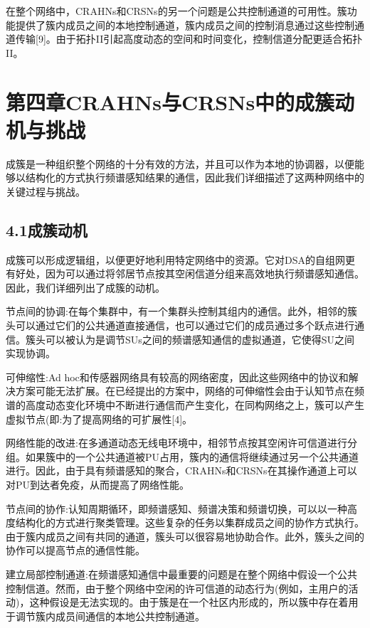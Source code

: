 \documentclass[a4paper,AutoFakeBold,oneside,12pt]{book}
\begin{document}
  在整个网络中，CRAHNs和CRSNs的另一个问题是公共控制通道的可用性。簇功能提供了簇内成员之间的本地控制通道，簇内成员之间的控制消息通过这些控制通道传输[9]。由于拓扑II引起高度动态的空间和时间变化，控制信道分配更适合拓扑II。


\chapter*{第四章\quad{}CRAHNs与CRSNs中的成簇动机与挑战}


  成簇是一种组织整个网络的十分有效的方法，并且可以作为本地的协调器，以便能够以结构化的方式执行频谱感知结果的通信，因此我们详细描述了这两种网络中的关键过程与挑战。


\section*{4.1\quad{}成簇动机}

  成簇可以形成逻辑组，以便更好地利用特定网络中的资源。它对DSA的自组网更有好处，因为可以通过将邻居节点按其空闲信道分组来高效地执行频谱感知通信。因此，我们详细列出了成簇的动机。

  节点间的协调:在每个集群中，有一个集群头控制其组内的通信。此外，相邻的簇头可以通过它们的公共通道直接通信，也可以通过它们的成员通过多个跃点进行通信。簇头可以被认为是调节SUs之间的频谱感知通信的虚拟通道，它使得SU之间实现协调。

 可伸缩性:Ad hoc和传感器网络具有较高的网络密度，因此这些网络中的协议和解决方案可能无法扩展。在已经提出的方案中，网络的可伸缩性会由于认知节点在频谱的高度动态变化环境中不断进行通信而产生变化，在同构网络之上，簇可以产生虚拟节点(即:为了提高网络的可扩展性[4]。

  网络性能的改进:在多通道动态无线电环境中，相邻节点按其空闲许可信道进行分组。如果簇中的一个公共通道被PU占用，簇内的通信将继续通过另一个公共通道进行。因此，由于具有频谱感知的聚合，CRAHNs和CRSNs在其操作通道上可以对PU到达者免疫，从而提高了网络性能。

  节点间的协作:认知周期循环，即频谱感知、频谱决策和频谱切换，可以以一种高度结构化的方式进行聚类管理。这些复杂的任务以集群成员之间的协作方式执行。由于簇内成员之间有共同的通道，簇头可以很容易地协助合作。此外，簇头之间的协作可以提高节点的通信性能。

  建立局部控制通道:在频谱感知通信中最重要的问题是在整个网络中假设一个公共控制信道。然而，由于整个网络中空闲的许可信道的动态行为(例如，主用户的活动)，这种假设是无法实现的。由于簇是在一个社区内形成的，所以簇中存在着用于调节簇内成员间通信的本地公共控制通道。
\end{document}
